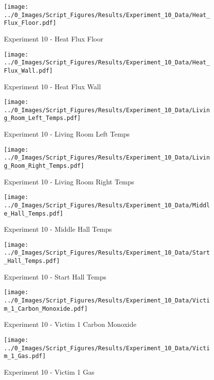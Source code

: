 	\begin{figure}[H]
		\centering
		\texttt{[image: ../0\_Images/Script\_Figures/Results/Experiment\_10\_Data/Heat\_Flux\_Floor.pdf]}
		\caption[]{Experiment 10 - Heat Flux Floor}
	\end{figure}
 
	\clearpage

	\begin{figure}[H]
		\centering
		\texttt{[image: ../0\_Images/Script\_Figures/Results/Experiment\_10\_Data/Heat\_Flux\_Wall.pdf]}
		\caption[]{Experiment 10 - Heat Flux Wall}
	\end{figure}
 

	\begin{figure}[H]
		\centering
		\texttt{[image: ../0\_Images/Script\_Figures/Results/Experiment\_10\_Data/Living\_Room\_Left\_Temps.pdf]}
		\caption[]{Experiment 10 - Living Room Left Temps}
	\end{figure}
 
	\clearpage

	\begin{figure}[H]
		\centering
		\texttt{[image: ../0\_Images/Script\_Figures/Results/Experiment\_10\_Data/Living\_Room\_Right\_Temps.pdf]}
		\caption[]{Experiment 10 - Living Room Right Temps}
	\end{figure}
 

	\begin{figure}[H]
		\centering
		\texttt{[image: ../0\_Images/Script\_Figures/Results/Experiment\_10\_Data/Middle\_Hall\_Temps.pdf]}
		\caption[]{Experiment 10 - Middle Hall Temps}
	\end{figure}
 
	\clearpage

	\begin{figure}[H]
		\centering
		\texttt{[image: ../0\_Images/Script\_Figures/Results/Experiment\_10\_Data/Start\_Hall\_Temps.pdf]}
		\caption[]{Experiment 10 - Start Hall Temps}
	\end{figure}
 

	\begin{figure}[H]
		\centering
		\texttt{[image: ../0\_Images/Script\_Figures/Results/Experiment\_10\_Data/Victim\_1\_Carbon\_Monoxide.pdf]}
		\caption[]{Experiment 10 - Victim 1 Carbon Monoxide}
	\end{figure}
 
	\clearpage

	\begin{figure}[H]
		\centering
		\texttt{[image: ../0\_Images/Script\_Figures/Results/Experiment\_10\_Data/Victim\_1\_Gas.pdf]}
		\caption[]{Experiment 10 - Victim 1 Gas}
	\end{figure}
 

